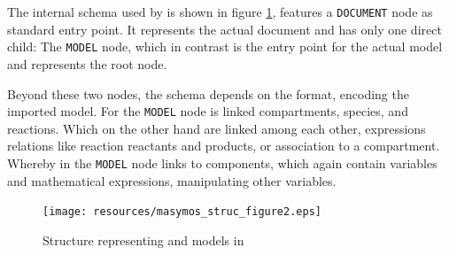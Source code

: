 The internal schema used by \masymos is shown in figure \ref{fig:background:graph-db:masymos}, features a \texttt{DOCUMENT} node as standard entry point. It represents the actual \xml document and has only one direct child: The \texttt{MODEL} node, which in contrast is the entry point for the actual model and represents the \xml root node.

Beyond these two nodes, the schema depends on the format, encoding the imported model. For \sbml the \texttt{MODEL} node is linked compartments, species, and reactions. Which on the other hand are linked among each other, expressions relations like reaction reactants and products, or association to a compartment.
Whereby in \cellml the \texttt{MODEL} node links to components, which again contain variables and mathematical expressions, manipulating other variables.

\begin{figure}
	\centering
	\texttt{[image: resources/masymos\_struc\_figure2.eps]}
	\caption{Structure representing \sbml and \cellml models in \masymos \cite{Henkel2015}}
	\label{fig:background:graph-db:masymos}
\end{figure}

